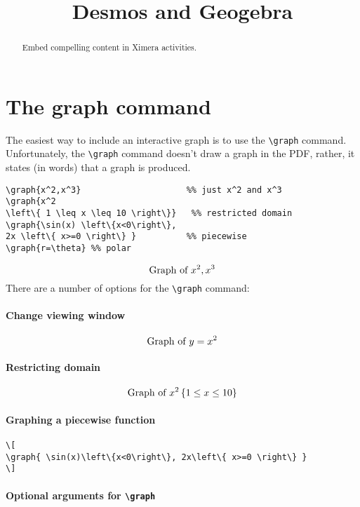 \documentclass{ximera}
\title{Desmos and Geogebra}
\begin{document}
\begin{abstract}
  Embed compelling content in Ximera activities.
\end{abstract}
\maketitle

\section{The graph command}

The easiest way to include an interactive graph is to use the
\verb|\graph| command. Unfortunately, the \verb|\graph| command
doesn't draw a graph in the PDF, rather, it states (in words) that a
graph is produced.
\begin{verbatim}
\graph{x^2,x^3}                     %% just x^2 and x^3
\graph{x^2 
\left\{ 1 \leq x \leq 10 \right\}}   %% restricted domain
\graph{\sin(x) \left\{x<0\right\}, 
2x \left\{ x>=0 \right\} }          %% piecewise
\graph{r=\theta} %% polar 
\end{verbatim}

\[
  \graph{x^2,x^3}
\]
There are a number of options for the \verb|\graph| command:



\paragraph{Change viewing window}
\[
  \graph[xmin=-5,xmax=5,ymin=-5,ymax=5]{y=x^2}
\]

\paragraph{Restricting domain}
\[
  \graph{x^2 \left\{ 1 \leq x \leq 10 \right\} }
\]
\paragraph{Graphing a piecewise function}

\begin{verbatim}
\[
\graph{ \sin(x)\left\{x<0\right\}, 2x\left\{ x>=0 \right\} }
\]
\end{verbatim}

\paragraph{Optional arguments for \texttt{\textbackslash graph}}
\end{document}
